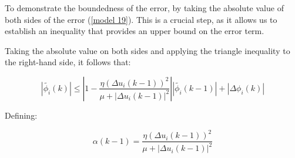 \documentclass[journal,onecolumn]{IEEEtran}
\begin{document}







To demonstrate the boundedness of the error, by taking the absolute value of both sides of the error (\ref{model 19}). This is a crucial step, as it allows us to establish an inequality that provides an upper bound on the error term.

Taking the absolute value on both sides and applying the triangle inequality to the right-hand side, it follows that:

\begin{equation}
\label{model 20}
|\tilde{\phi_i}(k)| \leq \left| 1 - \frac{\eta (\Delta u_i(k-1))^2}{\mu + |\Delta u_i(k-1)|^2} \right| |\tilde{\phi_i}(k-1)| + |\Delta \phi_i(k)|
\end{equation}

Defining:

\begin{equation}
\label{model 21}
\alpha(k-1) = \frac{\eta (\Delta u_i(k-1))^2}{\mu + |\Delta u_i(k-1)|^2}
\end{equation}
\end{document}
